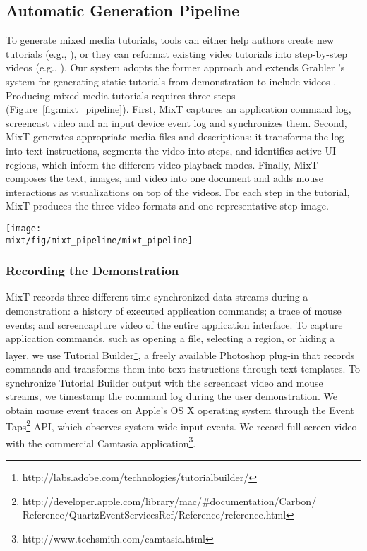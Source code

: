 \subsection{Automatic Generation Pipeline}
\label{mixt_pipeline}

To generate mixed media tutorials, tools can either help authors create new tutorials (e.g., \cite{Grabler:2009jj}), or they can reformat existing video tutorials into step-by-step videos (e.g., \cite{Pongnumkul:2011ju}). Our system adopts the former approach and extends Grabler \ea's system for generating static tutorials from demonstration to include videos \cite{Grabler:2009jj}. Producing mixed media tutorials requires three steps (Figure~\ref{fig:mixt_pipeline}). First, MixT captures an application command log, screencast video and an input device event log and synchronizes them. Second, MixT generates appropriate media files and descriptions: it transforms the log into text instructions, segments the video into steps, and identifies active UI regions, which inform the different video playback modes. Finally, MixT composes the text, images, and video into one document and adds mouse interactions as visualizations on top of the videos. For each step in the tutorial, MixT produces the three video formats and one representative step image.

\begin{figure*}[t]
  \centering
  \texttt{[image: \\mixt/fig/mixt\_pipeline/mixt\_pipeline]}
  \caption{MixT generates tutorials from video and log files.}
  \label{fig:mixt_pipeline}
\end{figure*}

\subsubsection{Recording the Demonstration}
MixT records three different time-synchronized data streams during a demonstration: a history of executed application commands; a trace of mouse events; and screencapture video of the entire application interface. To capture application commands, such as opening a file, selecting a region, or hiding a layer, we use Tutorial Builder\footnote{http://labs.adobe.com/technologies/tutorialbuilder/}, a freely available Photoshop plug-in that records commands and transforms them into text instructions through text templates. To synchronize Tutorial Builder output with the screencast video and mouse streams, we timestamp the command log during the user demonstration. We obtain mouse event traces on Apple’s OS X operating system through the Event Taps\footnote{http://developer.apple.com/library/mac/\#documentation/Carbon/\newline
Reference/QuartzEventServicesRef/Reference/reference.html} API, which observes system-wide input events. We record full-screen video with the commercial Camtasia application\footnote{http://www.techsmith.com/camtasia.html}.

